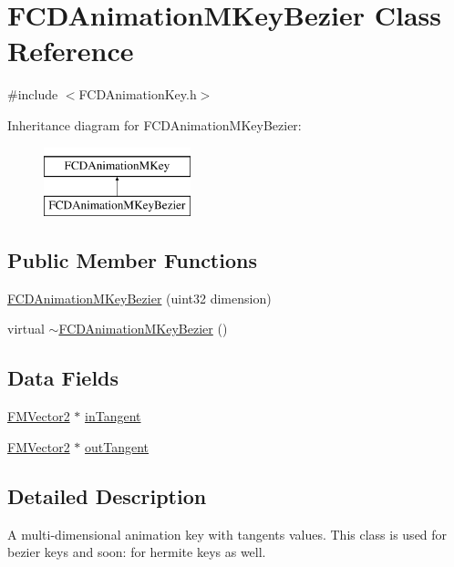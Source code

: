 \hypertarget{classFCDAnimationMKeyBezier}{
\section{FCDAnimationMKeyBezier Class Reference}
\label{classFCDAnimationMKeyBezier}
}


{\ttfamily \#include $<$FCDAnimationKey.h$>$}

Inheritance diagram for FCDAnimationMKeyBezier:\begin{figure}[H]
\begin{center}
\leavevmode
\includegraphics[height=2.000000cm]{classFCDAnimationMKeyBezier}
\end{center}
\end{figure}
\subsection*{Public Member Functions}
\begin{DoxyCompactItemize}
\item 
\hyperlink{classFCDAnimationMKeyBezier_a45aa55fc7430c817a8ab08882d2fcb9f}{FCDAnimationMKeyBezier} (uint32 dimension)
\item 
virtual \hyperlink{classFCDAnimationMKeyBezier_ae266c127ad7d936f2060b40c5368762f}{$\sim$FCDAnimationMKeyBezier} ()
\end{DoxyCompactItemize}
\subsection*{Data Fields}
\begin{DoxyCompactItemize}
\item 
\hyperlink{classFMVector2}{FMVector2} $\ast$ \hyperlink{classFCDAnimationMKeyBezier_aaf6f55f43516c1bf38cef19ecbb8fe21}{inTangent}
\item 
\hyperlink{classFMVector2}{FMVector2} $\ast$ \hyperlink{classFCDAnimationMKeyBezier_aea9338c2e0d894e9d5e9a4dcf00928e6}{outTangent}
\end{DoxyCompactItemize}


\subsection{Detailed Description}
A multi-\/dimensional animation key with tangents values. This class is used for bezier keys and soon: for hermite keys as well. 

